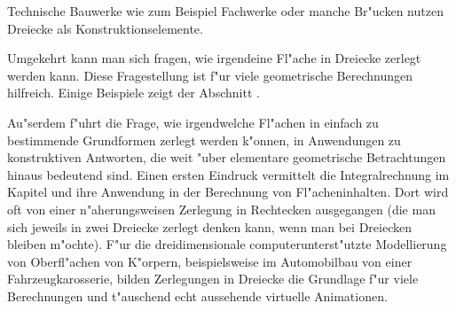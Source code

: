 \begin{MIntro}

Technische Bauwerke wie zum Beispiel Fachwerke oder manche Br"ucken nutzen 
Dreiecke als Konstruktionselemente.
\begin{center}
\end{center}
Umgekehrt kann man sich fragen, wie irgendeine Fl"ache in Dreiecke zerlegt 
werden kann. Diese Fragestellung ist f"ur viele geometrische Berechnungen
hilfreich. Einige Beispiele zeigt der Abschnitt . 

Au"serdem f"uhrt die Frage, wie irgendwelche Fl"achen in einfach zu 
bestimmende {\glqq}Grundformen{\grqq} zerlegt werden k"onnen, in Anwendungen 
zu konstruktiven Antworten, die weit "uber elementare geometrische 
Betrachtungen hinaus bedeutend sind. 
Einen ersten Eindruck vermittelt die Integralrechnung im Kapitel 
 und ihre Anwendung in der Berechnung von Fl"acheninhalten. 
Dort wird oft von einer {\glqq}n"aherungsweisen{\grqq} Zerlegung in Rechtecken 
ausgegangen (die man sich jeweils in zwei Dreiecke zerlegt denken kann, wenn 
man bei Dreiecken bleiben m"ochte). 
F"ur die dreidimensionale computerunterst"utzte Modellierung 
von Oberfl"achen von K"orpern, beispielsweise im Automobilbau von einer 
Fahrzeugkarosserie, bilden Zerlegungen in Dreiecke die Grundlage f"ur viele 
Berechnungen und t"auschend echt aussehende virtuelle Animationen.  
\end{MIntro}


